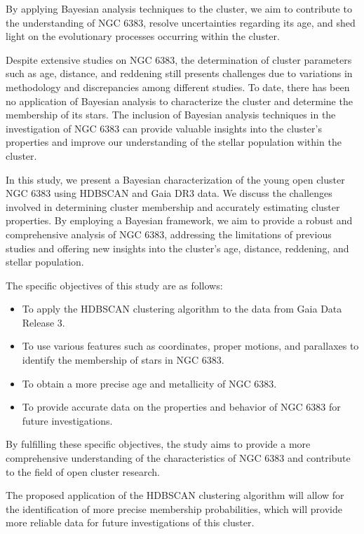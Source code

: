 \documentclass[baaa]{baaa}
\begin{document}
By applying Bayesian analysis techniques to the cluster, we aim to contribute to the understanding of NGC 6383, resolve uncertainties regarding its age, and shed light on the evolutionary processes occurring within the cluster.

Despite extensive studies on NGC 6383, the determination of cluster parameters such as age, distance, and reddening still presents challenges due to variations in methodology and discrepancies among different studies. To date, there has been no application of Bayesian analysis to characterize the cluster and determine the membership of its stars. The inclusion of Bayesian analysis techniques in the investigation of NGC 6383 can provide valuable insights into the cluster's properties and improve our understanding of the stellar population within the cluster.

In this study, we present a Bayesian characterization of the young open cluster NGC 6383 using HDBSCAN and Gaia DR3 data. We discuss the challenges involved in determining cluster membership and accurately estimating cluster properties. By employing a Bayesian framework, we aim to provide a robust and comprehensive analysis of NGC 6383, addressing the limitations of previous studies and offering new insights into the cluster's age, distance, reddening, and stellar population.

The specific objectives of this study are as follows:
\begin{itemize}
    \item To apply the HDBSCAN clustering algorithm to the data from Gaia Data Release 3.
\item To use various features such as coordinates, proper motions, and parallaxes to identify the membership of stars in NGC 6383.
\item To obtain a more precise age and metallicity of NGC 6383.
\item To provide accurate data on the properties and behavior of NGC 6383 for future investigations.
\end{itemize}

By fulfilling these specific objectives, the study aims to provide a more comprehensive understanding of the characteristics of NGC 6383 and contribute to the field of open cluster research. 

The proposed application of the HDBSCAN clustering algorithm will allow for the identification of more precise membership probabilities, which will provide more reliable data for future investigations of this cluster.
\end{document}
